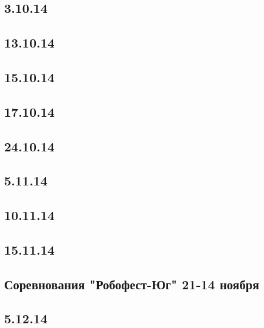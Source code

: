 \documentclass[11pt]{article}
\begin{document}
	\subsection{3.10.14}
	
	
	\subsection{13.10.14}
	
	
	\subsection{15.10.14}
	
	
	\subsection{17.10.14}
	

	\subsection{24.10.14}
		
	
	\subsection{5.11.14}
		

	\subsection{10.11.14}
	
	
	\subsection{15.11.14}
	

	\subsection{Соревнования "Робофест-Юг" 21-14 ноября }
	
	
	\subsection{5.12.14}
	
	
\end{document}
